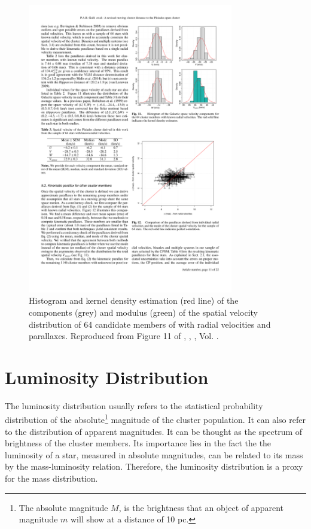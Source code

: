 \begin{figure}[ht!]
\begin{center}
\includegraphics[width=0.8\textwidth]{background/Figures/F11_Galli2017.pdf}
\caption{Histogram and kernel density estimation (red line) of the components (grey) and modulus (green) of the spatial velocity distribution of 64 candidate members of \citet{Galli2017} with radial velocities and parallaxes. Reproduced from Figure 11 of \citet{Galli2017}, \textit{}, , Vol. .}
\label{fig:velocityGalli}
\end{center}
\end{figure}

\section{Luminosity Distribution}

The luminosity distribution usually refers to the statistical probability distribution of the absolute\footnote{The absolute magnitude $M$, is the brightness that an object of apparent magnitude $m$ will show at a distance of 10 pc.} magnitude of the cluster population. It can also refer to the distribution of apparent magnitudes. It can be thought as the spectrum of brightness of the cluster members. Its importance lies in the fact the the luminosity of a star, measured in absolute magnitudes, can be related to its mass by the mass-luminosity relation. Therefore, the luminosity distribution is a proxy for the mass distribution. 

